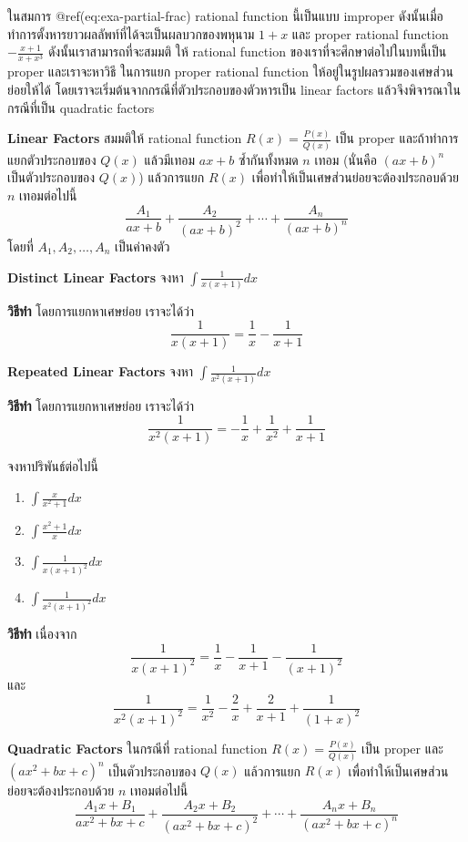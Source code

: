 \documentclass[
]{book}
\begin{document}
ในสมการ @ref(eq:exa-partial-frac) rational function นี้เป็นแบบ improper
ดังนั้นเมื่อทำการตั้งหารยาวผลลัพท์ที่ได้จะเป็นผลบวกของพหุนาม \(1 +x\) และ proper
rational function \(- \frac{x+1}{x + x^3}\) ดังนั้นเราสามารถที่จะสมมติ ให้
rational function ของเราที่จะศึกษาต่อไปในบทนี้เป็น proper และเราจะหาวิธี ในการแยก
proper rational function ให้อยู่ในรูปผลรวมของเศษส่วนย่อยให้ได้
โดยเราจะเริ่มต้นจากกรณีที่ตัวประกอบของตัวหารเป็น linear factors
แล้วจึงพิจารณาในกรณีที่เป็น quadratic factors

\textbf{Linear Factors} สมมติให้ rational function
\(R(x) = \frac{P(x)}{Q(x)}\) เป็น proper และถ้าทำการแยกตัวประกอบของ
\(Q(x)\) แล้วมีเทอม \(ax + b\) ซ้ำกันทั้งหมด \(n\) เทอม (นั่นคือ \((ax +b)^n\)
เป็นตัวประกอบของ \(Q(x)\)) แล้วการแยก \(R(x)\)
เพื่อทำให้เป็นเศษส่วนย่อยจะต้องประกอบด้วย \(n\) เทอมต่อไปนี้
\[\frac{A_1}{ax+b} +  \frac{A_2}{(ax+b)^2} + \cdots +  \frac{A_n}{(ax+b)^n}\]
โดยที่ \(A_1, A_2, \ldots, A_n\) เป็นค่าคงตัว

\textbf{Distinct Linear Factors} จงหา \(\int\frac{1}{x(x+1)} dx\)

\textbf{วิธีทำ} โดยการแยกหาเศษย่อย เราจะได้ว่า
\[\frac{1}{x(x+1)} = \frac{1}{x} - \frac{1}{x+1}\]

\textbf{Repeated Linear Factors} จงหา \(\int\frac{1}{x^2(x+1)} dx\)

\textbf{วิธีทำ} โดยการแยกหาเศษย่อย เราจะได้ว่า
\[\frac{1}{x^2(x+1)} = -\frac{1}{x} + \frac{1}{x^2} + \frac{1}{x+1}\]

จงหาปริพันธ์ต่อไปนี้

\begin{enumerate}
\def\labelenumi{\arabic{enumi}.}
\item
  \(\int \frac{x}{x^2+1} dx\)
\item
  \(\int \frac{x^2+1}{x} dx\)
\item
  \(\int \frac{1}{x(x+1)^2} dx\)
\item
  \(\int \frac{1}{x^2(x+1)^2} dx\)
\end{enumerate}

\textbf{วิธีทำ} เนื่องจาก
\[\frac{1}{x(x+1)^2} = \frac{1}{x} -\frac{1}{x+1} -\frac{1}{(x+1)^2}\]
และ
\[\frac{1}{x^2(x+1)^2} = \frac{1}{x^2} - \frac{2}{x} + \frac{2}{x+1} + \frac{1}{(1+x)^2}\]

\textbf{Quadratic Factors} ในกรณีที่ rational function
\(R(x) = \frac{P(x)}{Q(x)}\) เป็น proper และ \((ax^2 +bx+c)^n\)
เป็นตัวประกอบของ \(Q(x)\) แล้วการแยก \(R(x)\)
เพื่อทำให้เป็นเศษส่วนย่อยจะต้องประกอบด้วย \(n\) เทอมต่อไปนี้
\[\frac{A_1x + B_1}{ax^2+bx+c} +  \frac{A_2x + B_2}{({ax^2+bx+c})^2} + \cdots +  \frac{A_nx + B_n}{({ax^2+bx+c})^n}\]
\end{document}
